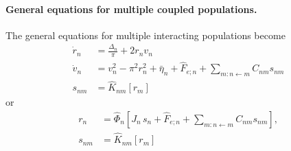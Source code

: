 \documentclass[12pt]{article}
\numberwithin{equation}{section}
\begin{document}
\paragraph{General equations for multiple coupled populations.} The general equations for multiple interacting populations become 
\begin{equation}
\begin{aligned} \label{eq:nmm2-general}
\dot r_n &=   \frac{\Delta_n}{\pi} + 2r_nv_n    \\
\dot v_n &=  v_n^2  -  \pi^2 r_n^2
 + \bar \eta_n +\hat F_{e;n} %
 + \sum_{m:n\leftarrow m} C_{nm} s_{nm}  \\
s_{nm} &= \hat K_{nm} [r_{m}]
\end{aligned}
\end{equation}
or
\begin{equation}
\begin{aligned}
     r_n &=  \hat \Phi_n [J_n\, s_n + \hat F_{e;n}  + \sum_{m:n\leftarrow m} C_{nm} s_{nm} ],   \\
 s_{nm} &= \hat K_{nm} [r_{m}]
\end{aligned}
\end{equation}
\end{document}
